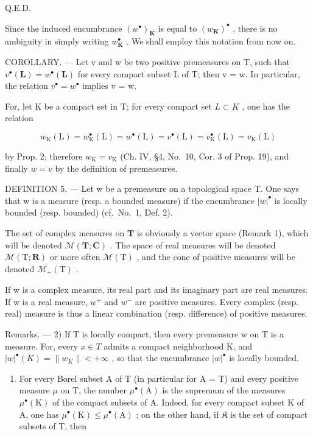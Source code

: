 Q.E.D.

Since the induced encumbrance \((w^{\bullet})_{\mathbf{K}}\) is equal to \((w_{\mathbf{K}})^{\bullet}\) , there is no ambiguity in simply writing \(w_{\mathbf{K}}^{\bullet}\) . We shall employ this notation from now on.

COROLLARY. --- Let v and w be two positive premeasures on T, such that \(v^{\bullet}(\mathbf{L}) = w^{\bullet}(\mathbf{L})\) for every compact subset L of T; then v = w. In particular, the relation \(v^{\bullet} = w^{\bullet}\) implies v = w.

For, let K be a compact set in T; for every compact set \(L \subset K\) , one has the relation

\[
w _ {\mathrm{K}} (\mathrm{L}) = w _ {\mathrm{K}} ^ {\bullet} (\mathrm{L}) = w ^ {\bullet} (\mathrm{L}) = v ^ {\bullet} (\mathrm{L}) = v _ {\mathrm{K}} ^ {\bullet} (\mathrm{L}) = v _ {\mathrm{K}} (\mathrm{L})
\]

by Prop. 2; therefore \(w_{\mathrm{K}} = v_{\mathrm{K}}\) (Ch. IV, §4, No.~10, Cor. 3 of Prop. 19), and finally \(w = v\) by the definition of premeasures.

DEFINITION 5. --- Let w be a premeasure on a topological space T. One says that w is a measure (resp. a bounded measure) if the encumbrance \(|w|^{\bullet}\) is locally bounded (resp. bounded) (cf.~No.~1, Def. 2).

The set of complex measures on \(\mathbf{T}\) is obviously a vector space (Remark 1), which will be denoted \(\mathcal{M}(\mathbf{T};\mathbf{C})\) . The space of real measures will be denoted \(\mathcal{M}(\mathrm{T};\mathbf{R})\) or more often \(\mathcal{M}(\mathrm{T})\) , and the cone of positive measures will be denoted \(\mathcal{M}_{+}(\mathrm{T})\) .

If w is a complex measure, its real part and its imaginary part are real measures. If w is a real measure, \(w^{+}\) and \(w^{-}\) are positive measures. Every complex (resp. real) measure is thus a linear combination (resp. difference) of positive measures.

Remarks. --- 2) If T is locally compact, then every premeasure w on T is a measure. For, every \(x \in T\) admits a compact neighborhood K, and \(|w|^{\bullet}(K) = \|w_{K}\| < +\infty\) , so that the encumbrance \(|w|^{\bullet}\) is locally bounded.

\begin{enumerate}
\def\labelenumi{\arabic{enumi})}
\setcounter{enumi}{2}
\tightlist
\item
  For every Borel subset A of T (in particular for A = T) and every positive measure \(\mu\) on T, the number \(\mu^{\bullet}(\mathrm{A})\) is the supremum of the measures \(\mu^{\bullet}(\mathrm{K})\) of the compact subsets of A. Indeed, for every compact subset K of A, one has \(\mu^{\bullet}(\mathrm{K}) \leqslant \mu^{\bullet}(\mathrm{A})\) ; on the other hand, if \(\mathfrak{K}\) is the set of compact subsets of T, then
\end{enumerate}

